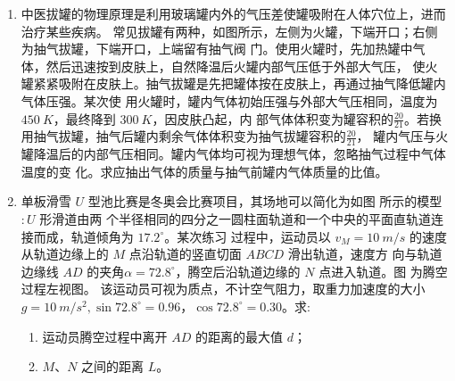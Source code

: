 \begin{enumerate}
\item
中医拔罐的物理原理是利用玻璃罐内外的气压差使罐吸附在人体穴位上，进而治疗某些疾病。
常见拔罐有两种，如图所示，左侧为火罐，下端开口；右侧为抽气拔罐，下端开口，上端留有抽气阀
门。使用火罐时，先加热罐中气体，然后迅速按到皮肤上，自然降温后火罐内部气压低于外部大气压，
使火罐紧紧吸附在皮肤上。抽气拔罐是先把罐体按在皮肤上，再通过抽气降低罐内气体压强。某次使
用火罐时，罐内气体初始压强与外部大气压相同，温度为 $ 450 \ K $，最终降到 $ 300 \ K $，因皮肤凸起，内
部气体体积变为罐容积的$ \frac{20}{21} $。若换用抽气拔罐，抽气后罐内剩余气体体积变为抽气拔罐容积的$ \frac{20}{21} $，
罐内气压与火罐降温后的内部气压相同。罐内气体均可视为理想气体，忽略抽气过程中气体温度的变
化。求应抽出气体的质量与抽气前罐内气体质量的比值。
\begin{figure}[h!]
\flushright

\end{figure}





\newpage
\item 
单板滑雪 $ U $ 型池比赛是冬奥会比赛项目，其场地可以简化为如图  所示的模型$ :U $ 形滑道由两
个半径相同的四分之一圆柱面轨道和一个中央的平面直轨道连接而成，轨道倾角为 $ 17.2 ^{ \circ } $。某次练习
过程中，运动员以 $ v_{M}=10 \ m/s $ 的速度从轨道边缘上的 $ M $ 点沿轨道的竖直切面 $ ABCD $ 滑出轨道，速度方
向与轨道边缘线 $ AD $ 的夹角$ \alpha =72.8 ^{ \circ } $，腾空后沿轨道边缘的 $ N $ 点进入轨道。图  为腾空过程左视图。
该运动员可视为质点，不计空气阻力，取重力加速度的大小 $ g=10 \ m/s^{2}, \sin 72.8 ^{ \circ } =0.96 $，$ \cos 72.8 ^{ \circ } =0.30$。求:
\begin{enumerate}
\item
运动员腾空过程中离开 $ AD $ 的距离的最大值 $ d $；
\item 
$ M $、$ N $ 之间的距离 $ L $。
\end{enumerate}
\begin{figure}[h!]
\flushright
\begin{subfigure}{0.4\linewidth}
\centering
 
\caption{}\label{2020:山东:16a}
\end{subfigure}
\begin{subfigure}{0.4\linewidth}
\centering
 
\caption{}\label{2020:山东:16b}
\end{subfigure}
\end{figure}




\end{enumerate}
